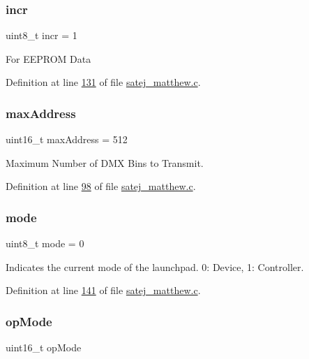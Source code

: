 \subsubsection{\texorpdfstring{incr}{incr}}
{\footnotesize\ttfamily uint8\+\_\+t incr = 1}

For E\+E\+P\+R\+OM Data 

Definition at line \mbox{\hyperlink{satej__matthew_8c_source_l00131}{131}} of file \mbox{\hyperlink{satej__matthew_8c_source}{satej\+\_\+matthew.\+c}}.

\mbox{\label{satej__matthew_8c_a00e6b200308fbb690bdc114e3ba5616b}} 
\subsubsection{\texorpdfstring{maxAddress}{maxAddress}}
{\footnotesize\ttfamily uint16\+\_\+t max\+Address = 512}

Maximum Number of D\+MX Bins to Transmit. 

Definition at line \mbox{\hyperlink{satej__matthew_8c_source_l00098}{98}} of file \mbox{\hyperlink{satej__matthew_8c_source}{satej\+\_\+matthew.\+c}}.

\mbox{\label{satej__matthew_8c_a37e90f5e3bd99fac2021fb3a326607d4}} 
\subsubsection{\texorpdfstring{mode}{mode}}
{\footnotesize\ttfamily uint8\+\_\+t mode = 0}

Indicates the current mode of the launchpad. 0\+: Device, 1\+: Controller. 

Definition at line \mbox{\hyperlink{satej__matthew_8c_source_l00141}{141}} of file \mbox{\hyperlink{satej__matthew_8c_source}{satej\+\_\+matthew.\+c}}.

\mbox{\label{satej__matthew_8c_a1aa9db2f061e57b247665a13005b6ea5}} 
\subsubsection{\texorpdfstring{opMode}{opMode}}
{\footnotesize\ttfamily uint16\+\_\+t op\+Mode}

